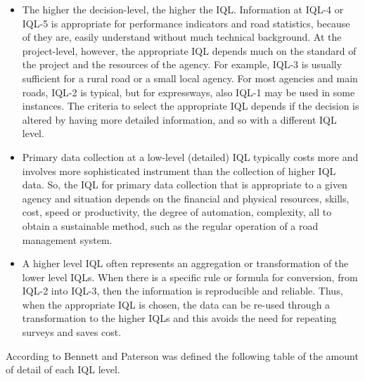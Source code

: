 \documentclass[tesi]{subfiles}
\begin{document}
\begin{itemize}

\item The higher the decision-level, the higher the IQL. Information at IQL-4 or IQL-5 is appropriate for performance indicators and road statistics, because of they are, easily understand without much technical background.
At the project-level, however, the appropriate IQL depends much on the standard of the project and the resources of the agency. For example, IQL-3 is usually sufficient for a rural road or a small local agency. For
most agencies and main roads, IQL-2 is typical, but for expressways, also IQL-1 may be used in some instances.
The criteria to select the appropriate IQL depends if the decision is altered by having more detailed information, and so with a different IQL level.

\item Primary data collection at a low-level (detailed) IQL typically costs more and involves more sophisticated instrument than the collection of higher IQL data. So, the IQL for primary data collection that is appropriate to a
given agency and situation depends on the financial and physical resources, skills, cost, speed or productivity, the degree of automation, complexity, all to obtain a  sustainable method, such as the regular operation of a road management system.

\item A higher level IQL often represents an aggregation or transformation of the lower level IQLs. When there is a specific rule or formula for conversion, from IQL-2 into IQL-3, then the information is reproducible and reliable. Thus, when the appropriate IQL is chosen, the
data can be re-used through a transformation to the higher IQLs and this avoids the need for repeating surveys and saves cost.


\end{itemize}
\clearpage
According to Bennett and Paterson\cite{bennett2000guide} was defined the following table of the amount of detail of each IQL level.
\end{document}
